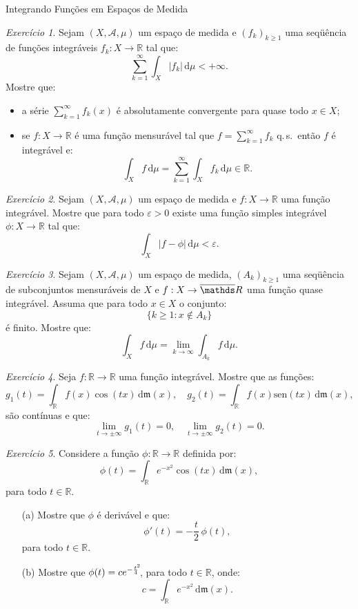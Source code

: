 \documentclass[oneside,final,11pt]{amsbook}
\newcommand{\R}{\mathds R}
\newcommand{\leb}{\mathfrak m}
\newcommand{\dd}{\mathrm d}
\newcommand{\qs}{\hbox{q.$\,$s.}}
\newcommand{\sen}{\mathrm{sen}}
\theoremstyle{remark}\newtheorem{exercise}{Exercício}[chapter]
\theoremstyle{remark}\newtheorem{*exercise}[exercise]{\hbox to 0pt{\hskip 0pt minus 1fil*}Exercício}
\theoremstyle{definition}\newtheorem{exdefin}{Definição}[chapter]
\theoremstyle{plain}\newtheorem{teo}{Teorema}[section]
\theoremstyle{plain}\newtheorem{lem}[teo]{Lema}
\theoremstyle{plain}\newtheorem{prop}[teo]{Proposição}
\theoremstyle{plain}\newtheorem{cor}[teo]{Corolário}
\theoremstyle{definition}\newtheorem{defin}[teo]{Definição}
\theoremstyle{remark}\newtheorem{rem}[teo]{Observação}
\theoremstyle{definition}\newtheorem{notation}[teo]{Notação}
\theoremstyle{definition}\newtheorem{convention}[teo]{Convenção}
\theoremstyle{definition}\newtheorem{example}[teo]{Exemplo}
\numberwithin{section}{chapter}
\numberwithin{equation}{section}
\begin{document}
\begin{chapter}{Integrando Funções em Espaços de Medida}
\begin{exercise}\label{exe:intseries}
Sejam $(X,\mathcal A,\mu)$ um espaço de medida e $(f_k)_{k\ge1}$ uma seqüência
de funções integráveis $f_k:X\to\R$ tal que:
\[\sum_{k=1}^\infty\int_X\vert f_k\vert\,\dd\mu<+\infty.\]
Mostre que:
\begin{itemize}
\item a série $\sum_{k=1}^\infty f_k(x)$ é absolutamente convergente para quase todo $x\in X$;
\item se $f:X\to\R$ é uma função mensurável tal que $f=\sum_{k=1}^\infty f_k$ \qs\ então
$f$ é integrável e:
\[\int_Xf\,\dd\mu=\sum_{k=1}^\infty\int_Xf_k\,\dd\mu\in\R.\]
\end{itemize}
\end{exercise}

\begin{exercise}
Sejam $(X,\mathcal A,\mu)$ um espaço de medida e $f:X\to\R$ uma função integrável.
Mostre que para todo $\varepsilon>0$ existe uma função simples integrável $\phi:X\to\R$
tal que:
\[\int_X\vert f-\phi\vert\,\dd\mu<\varepsilon.\]
\end{exercise}

\begin{exercise}\label{exe:conjuntosAk}
Sejam $(X,\mathcal A,\mu)$ um espaço de medida, $(A_k)_{k\ge1}$ uma seqüência de subconjuntos
mensuráveis de $X$ e $f:X\to\overline\R$ uma função quase integrável. Assuma que para todo
$x\in X$ o conjunto:
\[\big\{k\ge1:x\not\in A_k\big\}\]
é finito. Mostre que:
\[\int_Xf\,\dd\mu=\lim_{k\to\infty}\int_{A_k}f\,\dd\mu.\]
\end{exercise}

\begin{exercise}
Seja $f:\R\to\R$ uma função integrável. Mostre que as funções:
\[g_1(t)=\int_{\R}f(x)\cos(tx)\,\dd\leb(x),\quad
g_2(t)=\int_{\R}f(x)\sen(tx)\,\dd\leb(x),\]
são contínuas e que:
\[\lim_{t\to\pm\infty}g_1(t)=0,\quad\lim_{t\to\pm\infty}g_2(t)=0.\]
\end{exercise}

\begin{exercise}
Considere a função $\phi:\R\to\R$ definida por:
\[\phi(t)=\int_{\R}e^{-x^2}\cos(tx)\,\dd\leb(x),\]
para todo $t\in\R$.
\begin{itemize}
\item[(a)] Mostre que $\phi$ é derivável e que:
\[\phi'(t)=-\frac t2\,\phi(t),\]
para todo $t\in\R$.
\item[(b)] Mostre que
$\phi(t)=ce^{-\frac{t^{\hbox to0pt{$\scriptscriptstyle2$\hskip 0pt minus 1fil}}}4}$,
para todo $t\in\R$, onde:
\begin{equation}\label{eq:cintegralGauss}
c=\int_{\R}e^{-x^2}\,\dd\leb(x).
\end{equation}
\end{itemize}
\end{exercise}


\end{chapter}
\end{document}

